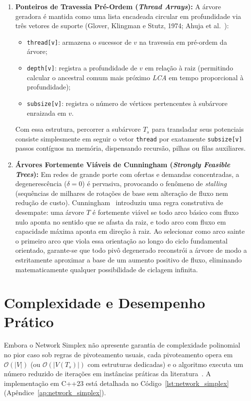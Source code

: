 \begin{enumerate}
    \item \textbf{Ponteiros de Travessia Pré-Ordem (\textit{Thread Arrays}):} A árvore geradora é mantida como uma lista encadeada circular em profundidade via três vetores de suporte (Glover, Klingman e Stutz, 1974; Ahuja et al.~\cite{ahuja1993network}):
    \begin{itemize}
        \item \lstinline{thread[v]}: armazena o sucessor de $v$ na travessia em pré-ordem da árvore;
        \item \lstinline{depth[v]}: registra a profundidade de $v$ em relação à raiz (permitindo calcular o ancestral comum mais próximo \textit{LCA} em tempo proporcional à profundidade);
        \item \lstinline{subsize[v]}: registra o número de vértices pertencentes à subárvore enraizada em $v$.
    \end{itemize}
    Com essa estrutura, percorrer a subárvore $T_s$ para transladar seus potenciais consiste simplesmente em seguir o vetor \lstinline{thread} por exatamente \lstinline{subsize[v]} passos contíguos na memória, dispensando recursão, pilhas ou filas auxiliares.
    \item \textbf{Árvores Fortemente Viáveis de Cunningham (\textit{Strongly Feasible Trees}):} Em redes de grande porte com ofertas e demandas concentradas, a degenerescência ($\delta = 0$) é pervasiva, provocando o fenômeno de \textit{stalling} (sequências de milhares de rotações de base sem alteração de fluxo nem redução de custo). Cunningham~\cite{cunningham1976network} introduziu uma regra construtiva de desempate: uma árvore $T$ é fortemente viável se todo arco básico com fluxo nulo aponta no sentido que se afasta da raiz, e todo arco com fluxo em capacidade máxima aponta em direção à raiz. Ao selecionar como arco sainte o primeiro arco que viola essa orientação ao longo do ciclo fundamental orientado, garante-se que todo pivô degenerado reconstrói a árvore de modo a estritamente aproximar a base de um aumento positivo de fluxo, eliminando matematicamente qualquer possibilidade de ciclagem infinita.
\end{enumerate}

\section{Complexidade e Desempenho Prático}\label{sec:simplex_complexidade}

Embora o Network Simplex não apresente garantia de complexidade polinomial no pior caso sob regras de pivoteamento usuais, cada pivoteamento opera em $\mathcal{O}(|V|)$ (ou $\mathcal{O}(|V(T_s)|)$ com estruturas dedicadas) e o algoritmo executa um número reduzido de iterações em instâncias práticas da literatura~\cite{ahuja1993network}. A implementação em C++23 está detalhada no Código~\ref{lst:network_simplex} (Apêndice~\ref{ap:network_simplex}).


